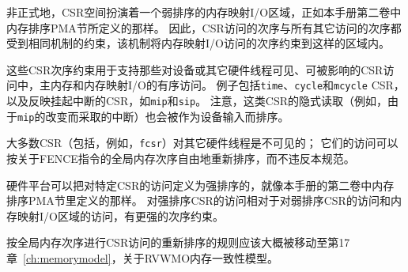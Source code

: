 \begin{commentary}
  非正式地，CSR空间扮演着一个弱排序的内存映射I/O区域，正如本手册第二卷中内存排序PMA节所定义的那样。
  因此，CSR访问的次序与所有其它访问的次序都受到相同机制的约束，该机制将内存映射I/O访问的次序约束到这样的区域内。

这些CSR次序约束用于支持那些对设备或其它硬件线程可见、可被影响的CSR访问中，主内存和内存映射I/O的有序访问。
例子包括{\tt time}、{\tt cycle}和{\tt mcycle} CSR，以及反映挂起中断的CSR，如{\tt mip}和{\tt sip}。
注意，这类CSR的隐式读取（例如，由于{\tt mip}的改变而采取的中断）也会被作为设备输入而排序。

大多数CSR（包括，例如，{\tt fcsr}）对其它硬件线程是不可见的；
它们的访问可以按关于FENCE指令的全局内存次序自由地重新排序，而不违反本规范。
\end{commentary}

硬件平台可以把对特定CSR的访问定义为强排序的，就像本手册的第二卷中内存排序PMA节里定义的那样。
对强排序CSR的访问相对于对弱排序CSR的访问和内存映射I/O区域的访问，有更强的次序约束。

\begin{commentary}
  按全局内存次序进行CSR访问的重新排序的规则应该大概被移动至第17章~\ref{ch:memorymodel}，关于RVWMO内存一致性模型。
\end{commentary}
